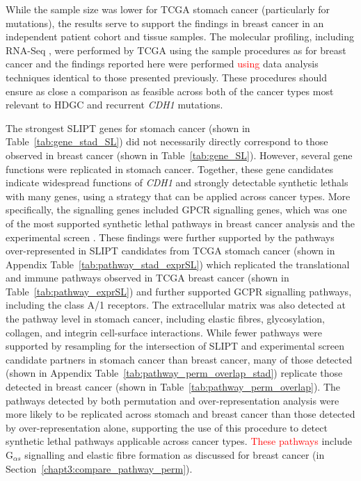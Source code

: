 While the sample size was lower for \gls{TCGA} stomach cancer (particularly for \glspl{mutation}), the results serve to support the findings in breast cancer in an independent patient cohort and tissue samples. The molecular profiling, including \gls{RNA-Seq} , were performed by \gls{TCGA} using the sample procedures as for breast cancer and the findings reported here were performed \textcolor{red}{using} data analysis techniques identical to those presented previously. These procedures should ensure as close a comparison as feasible across both of the cancer types most relevant to \gls{HDGC} and recurrent \textit{CDH1} \glspl{mutation}.

The strongest \gls{SLIPT} genes for stomach cancer (shown in Table~\ref{tab:gene_stad_SL}) did not necessarily directly correspond to those observed in breast cancer (shown in Table~\ref{tab:gene_SL}). However, several gene functions were replicated in stomach cancer. Together, these gene candidates indicate widespread functions of \textit{CDH1} and strongly detectable \glspl{synthetic lethal} with many genes, using a strategy that can be applied across cancer types. More specifically, the signalling genes included \gls{GPCR} signalling genes, which was one of the most supported \gls{synthetic lethal} \glspl{pathway} in breast cancer analysis and the experimental screen \citep{Telford2015}.%
These findings were further supported by the \glspl{pathway} over-represented in \gls{SLIPT} candidates from \gls{TCGA} stomach cancer (shown in Appendix Table~\ref{tab:pathway_stad_exprSL}) which replicated the translational and immune \glspl{pathway} observed in \gls{TCGA} breast cancer (shown in Table~\ref{tab:pathway_exprSL}) and further supported GCPR signalling \glspl{pathway}, including the class A/1 receptors. The extracellular matrix was also detected at the \gls{pathway} level in stomach cancer, including elastic fibres, glycosylation, collagen, and integrin cell-surface interactions. 
While fewer \glspl{pathway} were supported by resampling for the intersection of \gls{SLIPT} and experimental screen candidate partners in stomach cancer than breast cancer, many of those detected (shown in Appendix Table~\ref{tab:pathway_perm_overlap_stad}) replicate those detected in breast cancer (shown in Table~\ref{tab:pathway_perm_overlap}). The \glspl{pathway} detected by both permutation and over-representation analysis were more likely to be replicated across stomach and breast cancer than those detected by over-representation alone, supporting the use of this procedure to detect \gls{synthetic lethal} \glspl{pathway} applicable across cancer types. \textcolor{red}{These pathways} include G$_{\alpha s}$ signalling and elastic fibre formation as discussed for breast cancer (in Section~\ref{chapt3:compare_pathway_perm}).


